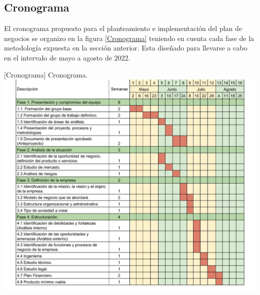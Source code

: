 \subsection{Cronograma}

El cronograma propuesto para el planteamiento e implementación del plan de negocios se organizo en la figura \ref{Cronograma} teniendo en cuenta cada fase de la metodología expuesta en la sección anterior. Esta diseñado para llevarse a cabo en el intervalo de mayo a agosto de 2022.


\vspace{5mm}
\begin{minipage}{0.8\textwidth}
\centering
{}[{Cronograma}]{ Cronograma. }
\label{Cronograma}
  \includegraphics[width=1.1\textwidth]{Images/Emprendedores 2022-1 - Cronograma Anterpoyecto-1.png}

\end{minipage}